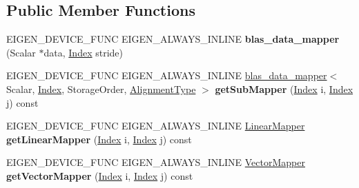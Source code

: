 \subsection*{Public Member Functions}
\begin{DoxyCompactItemize}
\item 
\mbox{\label{class_eigen_1_1internal_1_1blas__data__mapper_adb0990f4121cc371ff39e18243fa7f75}} 
E\+I\+G\+E\+N\+\_\+\+D\+E\+V\+I\+C\+E\+\_\+\+F\+U\+NC E\+I\+G\+E\+N\+\_\+\+A\+L\+W\+A\+Y\+S\+\_\+\+I\+N\+L\+I\+NE {\bfseries blas\+\_\+data\+\_\+mapper} (Scalar $\ast$data, \hyperlink{namespace_eigen_a62e77e0933482dafde8fe197d9a2cfde}{Index} stride)
\item 
\mbox{\label{class_eigen_1_1internal_1_1blas__data__mapper_a3ec8250149dcb94a1adabeaca916e022}} 
E\+I\+G\+E\+N\+\_\+\+D\+E\+V\+I\+C\+E\+\_\+\+F\+U\+NC E\+I\+G\+E\+N\+\_\+\+A\+L\+W\+A\+Y\+S\+\_\+\+I\+N\+L\+I\+NE \hyperlink{class_eigen_1_1internal_1_1blas__data__mapper}{blas\+\_\+data\+\_\+mapper}$<$ Scalar, \hyperlink{namespace_eigen_a62e77e0933482dafde8fe197d9a2cfde}{Index}, Storage\+Order, \hyperlink{group__enums_ga45fe06e29902b7a2773de05ba27b47a1}{Alignment\+Type} $>$ {\bfseries get\+Sub\+Mapper} (\hyperlink{namespace_eigen_a62e77e0933482dafde8fe197d9a2cfde}{Index} i, \hyperlink{namespace_eigen_a62e77e0933482dafde8fe197d9a2cfde}{Index} j) const
\item 
\mbox{\label{class_eigen_1_1internal_1_1blas__data__mapper_a8564af1d8d9304f73e40bd11caf319f7}} 
E\+I\+G\+E\+N\+\_\+\+D\+E\+V\+I\+C\+E\+\_\+\+F\+U\+NC E\+I\+G\+E\+N\+\_\+\+A\+L\+W\+A\+Y\+S\+\_\+\+I\+N\+L\+I\+NE \hyperlink{class_eigen_1_1internal_1_1_blas_linear_mapper}{Linear\+Mapper} {\bfseries get\+Linear\+Mapper} (\hyperlink{namespace_eigen_a62e77e0933482dafde8fe197d9a2cfde}{Index} i, \hyperlink{namespace_eigen_a62e77e0933482dafde8fe197d9a2cfde}{Index} j) const
\item 
\mbox{\label{class_eigen_1_1internal_1_1blas__data__mapper_acd275391ce4e8698f1c4001bdc7f17e6}} 
E\+I\+G\+E\+N\+\_\+\+D\+E\+V\+I\+C\+E\+\_\+\+F\+U\+NC E\+I\+G\+E\+N\+\_\+\+A\+L\+W\+A\+Y\+S\+\_\+\+I\+N\+L\+I\+NE \hyperlink{class_eigen_1_1internal_1_1_blas_vector_mapper}{Vector\+Mapper} {\bfseries get\+Vector\+Mapper} (\hyperlink{namespace_eigen_a62e77e0933482dafde8fe197d9a2cfde}{Index} i, \hyperlink{namespace_eigen_a62e77e0933482dafde8fe197d9a2cfde}{Index} j) const

\end{DoxyCompactItemize}
